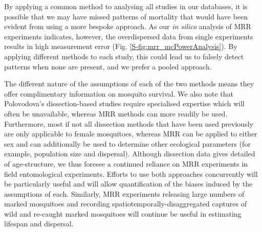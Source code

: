 \documentclass[]{article}
\begin{document}
By applying a common method to analysing all studies in our databases,
it is possible that we may have missed patterns of mortality that would
have been evident from using a more bespoke approach. As our \emph{in
silico} analysis of MRR experiments indicates, however, the
overdispersed data from single experiments results in high measurement
error (Fig. \ref{S-fig:mrr_mcPowerAnalysis}). By applying different methods to each study, this
could lead us to falsely detect patterns when none are present, and we
prefer a pooled approach.

The different nature of the assumptions of each of the two methods means
they offer complimentary information on mosquito survival. We also note
that Polovodova's dissection-based studies require specialised expertise
which will often be unavailable, whereas MRR methods can more readily be
used. Furthermore, most if not all dissection methods that have been
used previously are only applicable to female mosquitoes, whereas MRR
can be applied to either sex and can additionally be used to determine
other ecological parameters (for example, population size and
dispersal). Although dissection data gives detailed of age-structure, we
thus foresee a continued reliance on MRR experiments in field
entomological experiments. Efforts to use both approaches concurrently
will be particularly useful and will allow quantification of the biases
induced by the assumptions of each. Similarly, MRR experiments releasing
large numbers of marked mosquitoes and recording
spatiotemporally-disaggregated captures of wild and re-caught marked
mosquitoes will continue be useful in estimating lifespan and dispersal.
\end{document}
